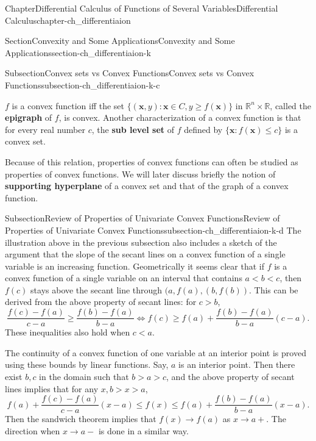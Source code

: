 \documentclass[oneside,10pt,]{book}
\newcommand{\terminology}[1]{\textbf{#1}}
\numberwithin{equation}{section}
\newcommand{\lt}{<}
\begin{document}
\begin{chapterptx}{Chapter}{Differential Calculus of Functions of Several Variables}{}{Differential Calculus}{}{}{chapter-ch_differentiaion}
\begin{sectionptx}{Section}{Convexity and Some Applications}{}{Convexity and Some Applications}{}{}{section-ch_differentiaion-k}
\begin{subsectionptx}{Subsection}{Convex sets vs Convex Functions}{}{Convex sets vs Convex Functions}{}{}{subsection-ch_differentiaion-k-c}
\par
\(f\) is  a convex function iff the set \(\{(\mathbf x, y): \mathbf x\in C, y\ge f(\mathbf x)\}\) in \(\mathbb R^{n}\times \mathbb R\), called the \terminology{epigraph} of \(f\), is convex.  Another characterization of a convex function is that for every real number \(c\), the \terminology{sub level set} of \(f\) defined by \(\{\mathbf x: f(\mathbf x)\le c\}\) is a convex set.%
\par
Because of this relation, properties of convex functions can often be studied as properties of convex functions. We will later discuss briefly the notion of \terminology{supporting hyperplane} of a convex set and that of the graph of a convex function.%
\end{subsectionptx}
%
%
\typeout{************************************************}
\typeout{************************************************}
%
\begin{subsectionptx}{Subsection}{Review of Properties  of Univariate Convex  Functions}{}{Review of Properties  of Univariate Convex  Functions}{}{}{subsection-ch_differentiaion-k-d}
The  illustration above in the previous subsection also includes a sketch of the argument that the slope of the secant lines on a convex function of a single variable is an increasing function. Geometrically it seems clear that if \(f\) is a convex function of a single variable on an interval that contains \(a\lt b \lt c\), then \(f(c)\) stays above the secant line through \((a, f(a), (b, f(b))\). This can be derived from the above property of secant lines: for \(c>b\),%
\begin{equation*}
\frac{f(c)-f(a)}{c-a} \ge \frac{f(b)-f(a)}{b-a}  \Leftrightarrow f(c)\ge f(a)+ \frac{f(b)-f(a)}{b-a}(c-a).
\end{equation*}
These inequalities also hold when \(c\lt a\).%
\par
The continuity of a convex function of one variable at an interior point is proved using these bounds by linear functions. Say, \(a\) is an interior point. Then there exist \(b, c\) in the domain such that \(b>a>c\), and the above property of secant lines implies that for any \(x, b>x>a\),%
\begin{equation*}
f(a)+  \frac{f(c)-f(a)}{c-a}(x-a)\le f(x)\le  f(a)+ \frac{f(b)-f(a)}{b-a}(x-a).
\end{equation*}
Then the sandwich theorem implies that \(f(x)\to f(a)\) as \(x\to a+\). The direction when \(x\to a-\) is done in a similar way.%

\end{subsectionptx}
\end{sectionptx}
\end{chapterptx}
\end{document}

